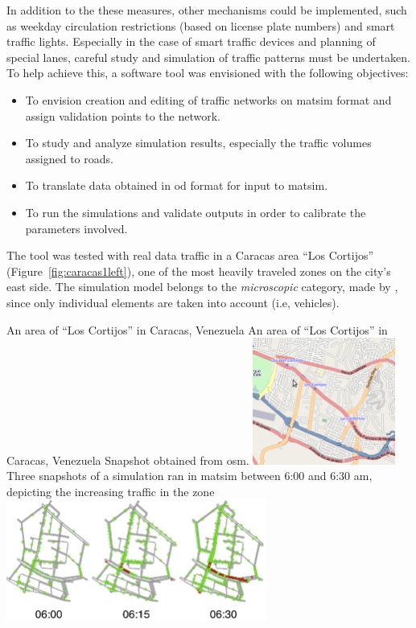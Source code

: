 In addition to the these measures, other mechanisms could be implemented, such as weekday circulation restrictions (\eg based on license plate numbers) and smart traffic lights. Especially in the case of smart traffic devices and planning of special lanes, careful study and simulation of traffic patterns must be undertaken. To help achieve this, a software tool was envisioned with the following objectives:

\begin{itemize}
 \item To envision creation and editing of traffic networks on \gls{matsim} format and assign validation points to the network.

\item To study and analyze simulation results, especially the traffic volumes assigned to roads.

\item To translate data obtained in \gls{od} format for input to \gls{matsim}.

\item To run the simulations and validate outputs in order to calibrate the parameters involved.
\end{itemize}

The tool was tested with real data traffic in a Caracas area ``Los Cortijos'' (Figure~\ref{fig:caracas1left}), one of the most heavily traveled zones on the city's east side. The simulation model belongs to the \emph{microscopic} category, made by \citet{gartner2001}, since only individual elements are taken into account (i.e, vehicles).

\createfigure%
{An area of ``Los Cortijos'' in Caracas, Venezuela}%
{An area of ``Los Cortijos'' in Caracas, Venezuela}%
{\label{fig:caracas1}}%
{%
 \createsubfigure%
 {Snapshot obtained from \gls{osm}.}
 {\includegraphics[width=0.35\textwidth, angle=0]{./scenarios/figures/caracas0.png}}
 {\label{fig:caracas1left}}
\createsubfigure%
 {Three snapshots of a simulation ran in \gls{matsim} between 6:00 and 6:30 am, depicting the increasing traffic in the zone}
 {\includegraphics[width=0.64\textwidth, angle=0]{./scenarios/figures/caracas1.jpg}}
 {\label{fig:caracas1right}}
}%
{}

